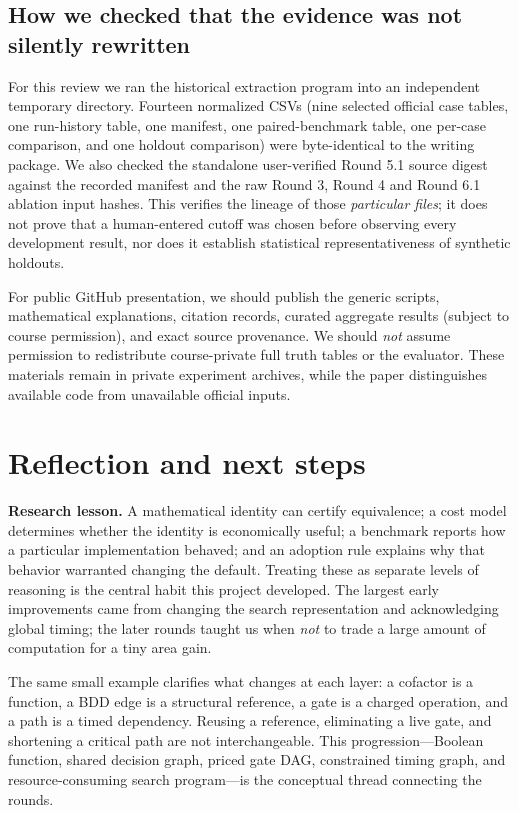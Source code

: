 \subsection{How we checked that the evidence was not silently rewritten}
For this review we ran the historical extraction program into an independent temporary directory. Fourteen normalized CSVs (nine selected official case tables, one run-history table, one manifest, one paired-benchmark table, one per-case comparison, and one holdout comparison) were byte-identical to the writing package. We also checked the standalone user-verified Round 5.1 source digest against the recorded manifest and the raw Round 3, Round 4 and Round 6.1 ablation input hashes. This verifies the lineage of those \emph{particular files}; it does not prove that a human-entered cutoff was chosen before observing every development result, nor does it establish statistical representativeness of synthetic holdouts.

For public GitHub presentation, we should publish the generic scripts, mathematical explanations, citation records, curated aggregate results (subject to course permission), and exact source provenance. We should \emph{not} assume permission to redistribute course-private full truth tables or the evaluator. These materials remain in private experiment archives, while the paper distinguishes available code from unavailable official inputs.


\section{Reflection and next steps}
\textbf{Research lesson.} A mathematical identity can certify equivalence; a cost model determines whether the identity is economically useful; a benchmark reports how a particular implementation behaved; and an adoption rule explains why that behavior warranted changing the default. Treating these as separate levels of reasoning is the central habit this project developed. The largest early improvements came from changing the search representation and acknowledging global timing; the later rounds taught us when \emph{not} to trade a large amount of computation for a tiny area gain.

The same small example clarifies what changes at each layer: a cofactor is a function, a BDD edge is a structural reference, a gate is a charged operation, and a path is a timed dependency. Reusing a reference, eliminating a live gate, and shortening a critical path are not interchangeable. This progression---Boolean function, shared decision graph, priced gate DAG, constrained timing graph, and resource-consuming search program---is the conceptual thread connecting the rounds.

